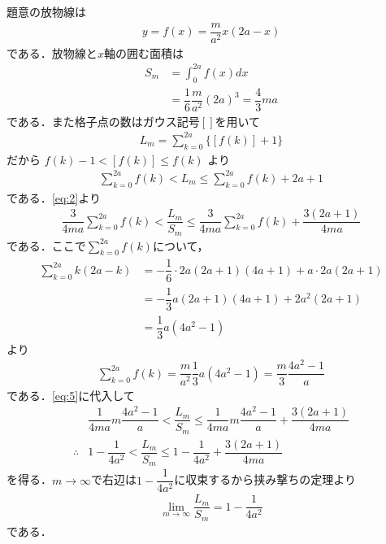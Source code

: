 \documentclass[../../main.tex]{subfiles}
\begin{document}
題意の放物線は
\begin{align}
  y = f(x) = \dfrac{m}{a^2}x(2a-x) \label{eq:1}
\end{align}
である．放物線と$x$軸の囲む面積は
\begin{align}
  S_m
  &= \int_0^{2a} f(x) dx \\
  &= \dfrac{1}{6} \dfrac{m}{a^2} (2a)^3 = \dfrac{4}{3}ma \label{eq:2}
\end{align}
である．また格子点の数はガウス記号$[]$を用いて
\begin{align}
  L_m = \sum_{k=0}^{2a} \{ [f(k)] + 1 \} \label{eq:3}
\end{align}
だから $f(k)-1 < [f(k)] \le f(k)$ より
\begin{align}
  \sum_{k=0}^{2a} f(k) < L_m \le \sum_{k=0}^{2a} f(k) + 2a + 1 \label{eq:4}
\end{align}
である．\cref{eq:2}より
\begin{align}
  \dfrac{3}{4ma} \sum_{k=0}^{2a} f(k)
  < \dfrac{L_m}{S_m}
  \le \dfrac{3}{4ma} \sum_{k=0}^{2a} f(k) + \dfrac{3(2a+1)}{4ma} \label{eq:5}
\end{align}
である．ここで$\sum_{k=0}^{2a} f(k)$について，
\begin{align}
  \sum_{k=0}^{2a} k(2a-k) &= -\dfrac{1}{6} \cdot 2a(2a+1)(4a+1) + a \cdot 2a(2a+1) \\
  &= -\dfrac{1}{3}a(2a+1)(4a+1) + 2a^2(2a+1) \\
  &= \dfrac{1}{3}a(4a^2-1)
\end{align}
より
\begin{align}
  \sum_{k=0}^{2a} f(k) = \dfrac{m}{a^2} \dfrac{1}{3}a(4a^2-1) = \dfrac{m}{3} \dfrac{4a^2-1}{a} \label{eq:6}
\end{align}
である．\cref{eq:5}に代入して
\begin{align}
  & \dfrac{1}{4ma} m \dfrac{4a^2-1}{a}
  < \dfrac{L_m}{S_m}
  \le \dfrac{1}{4ma} m \dfrac{4a^2-1}{a} + \dfrac{3(2a+1)}{4ma} \\
  \therefore
  & 1 - \dfrac{1}{4a^2} < \dfrac{L_m}{S_m} \le 1 - \dfrac{1}{4a^2} + \dfrac{3(2a+1)}{4ma}
\end{align}
を得る．$m\to\infty$で右辺は$1 - \dfrac{1}{4a^2}$に収束するから挟み撃ちの定理より
\begin{align}
  \lim_{m\to\infty} \dfrac{L_m}{S_m} = 1 - \dfrac{1}{4a^2}
\end{align}
である．
\end{document}
